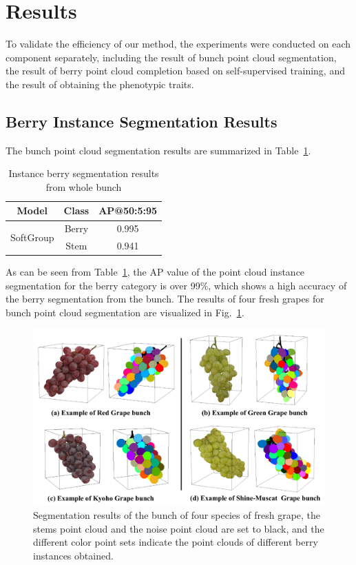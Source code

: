 \documentclass[12pt]{article}
\begin{document}
\section{Results}

To validate the efficiency of our method, the experiments were conducted on each component separately, including the result of bunch point cloud segmentation, the result of berry point cloud completion based on self-supervised training, and the result of obtaining the phenotypic traits.

\subsection{Berry Instance Segmentation Results}

The bunch point cloud segmentation results are summarized in Table~\ref{tbl:3}. 

\begin{table}[h]
    \centering
    \caption{Instance berry segmentation results from whole bunch}
    \begin{tabular}{ccc}
        \hline
        \textbf{Model} & \textbf{Class} & \textbf{AP@50:5:95} \\
        \hline
        \multirow{2}{*}{SoftGroup \citep{vu_softgroup_2022}} & Berry & 0.995 \\
        \cline{2-3}
        & Stem & 0.941 \\
        \hline
    \end{tabular}
    \label{tbl:3}
\end{table}

As can be seen from Table~\ref{tbl:3}, the AP value of the point cloud instance segmentation for the berry category is over 99\%, which shows a high accuracy of the berry segmentation from the bunch. The results of four fresh grapes for bunch point cloud segmentation are visualized in Fig.~\ref{fig:raw13}.

\begin{figure}[hbt!]
    \centering
    \includegraphics[width=1\textwidth]{figures/Figure11.pdf}
    \caption{Segmentation results of the bunch of four species of fresh grape, the stems point cloud and the noise point cloud are set to black, and the different color point sets indicate the point clouds of different berry instances obtained.}
    \label{fig:raw13}
\end{figure}
\end{document}
